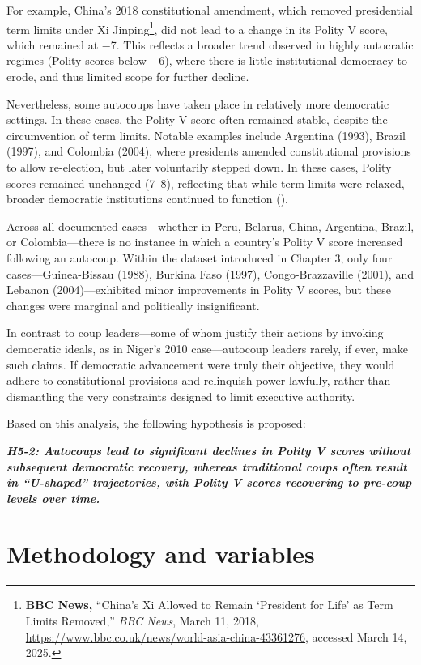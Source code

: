 \documentclass[
  12pt,
]{report}
\begin{document}
For example, China's 2018 constitutional amendment, which removed
presidential term limits under Xi Jinping\footnote{\textbf{BBC News,}
  ``China's Xi Allowed to Remain `President for Life' as Term Limits
  Removed,'' \emph{BBC News}, March 11, 2018,
  \url{https://www.bbc.co.uk/news/world-asia-china-43361276}, accessed
  March 14, 2025.}, did not lead to a change in its Polity V score,
which remained at −7. This reflects a broader trend observed in highly
autocratic regimes (Polity scores below −6), where there is little
institutional democracy to erode, and thus limited scope for further
decline.

Nevertheless, some autocoups have taken place in relatively more
democratic settings. In these cases, the Polity V score often remained
stable, despite the circumvention of term limits. Notable examples
include Argentina (1993), Brazil (1997), and Colombia (2004), where
presidents amended constitutional provisions to allow re-election, but
later voluntarily stepped down. In these cases, Polity scores remained
unchanged (7--8), reflecting that while term limits were relaxed,
broader democratic institutions continued to function
().

Across all documented cases---whether in Peru, Belarus, China,
Argentina, Brazil, or Colombia---there is no instance in which a
country's Polity V score increased following an autocoup. Within the
dataset introduced in Chapter 3, only four cases---Guinea-Bissau (1988),
Burkina Faso (1997), Congo-Brazzaville (2001), and Lebanon
(2004)---exhibited minor improvements in Polity V scores, but these
changes were marginal and politically insignificant.

In contrast to coup leaders---some of whom justify their actions by
invoking democratic ideals, as in Niger's 2010 case---autocoup leaders
rarely, if ever, make such claims. If democratic advancement were truly
their objective, they would adhere to constitutional provisions and
relinquish power lawfully, rather than dismantling the very constraints
designed to limit executive authority.

Based on this analysis, the following hypothesis is proposed:

\textbf{\emph{H5-2: Autocoups lead to significant declines in Polity V
scores without subsequent democratic recovery, whereas traditional coups
often result in ``U-shaped'' trajectories, with Polity V scores
recovering to pre-coup levels over time.}}

\section{Methodology and variables}\label{methodology-and-variables}
\end{document}

